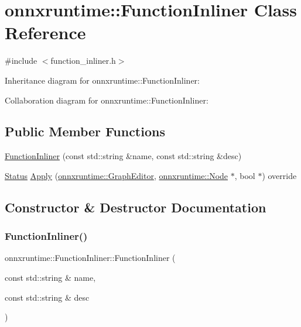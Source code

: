 \hypertarget{classonnxruntime_1_1FunctionInliner}{}\section{onnxruntime\+:\+:Function\+Inliner Class Reference}
\label{classonnxruntime_1_1FunctionInliner}


{\ttfamily \#include $<$function\+\_\+inliner.\+h$>$}



Inheritance diagram for onnxruntime\+:\+:Function\+Inliner\+:


Collaboration diagram for onnxruntime\+:\+:Function\+Inliner\+:
\subsection*{Public Member Functions}
\begin{DoxyCompactItemize}
\item 
\mbox{\hyperlink{classonnxruntime_1_1FunctionInliner_a92bbb035d13106ac204195905e53f387}{Function\+Inliner}} (const std\+::string \&name, const std\+::string \&desc)
\item 
\mbox{\hyperlink{classonnxruntime_1_1common_1_1Status}{Status}} \mbox{\hyperlink{classonnxruntime_1_1FunctionInliner_aaa7e58cb85ad8529b138afaee6b1d149}{Apply}} (\mbox{\hyperlink{classonnxruntime_1_1GraphEditor}{onnxruntime\+::\+Graph\+Editor}}, \mbox{\hyperlink{classonnxruntime_1_1Node}{onnxruntime\+::\+Node}} $\ast$, bool $\ast$) override
\end{DoxyCompactItemize}


\subsection{Constructor \& Destructor Documentation}
\mbox{\label{classonnxruntime_1_1FunctionInliner_a92bbb035d13106ac204195905e53f387}} 
\subsubsection{\texorpdfstring{Function\+Inliner()}{FunctionInliner()}}
{\footnotesize\ttfamily onnxruntime\+::\+Function\+Inliner\+::\+Function\+Inliner (\begin{DoxyParamCaption}\item[{const std\+::string \&}]{name,  }\item[{const std\+::string \&}]{desc }\end{DoxyParamCaption})\hspace{0.3cm}{\ttfamily [inline]}}




